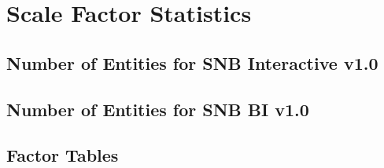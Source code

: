 \chapter{Scale Factor Statistics}
\label{sec:sf-statistics}

\section{Number of Entities for SNB Interactive v1.0}



\section{Number of Entities for SNB BI v1.0}





\section{Factor Tables}


